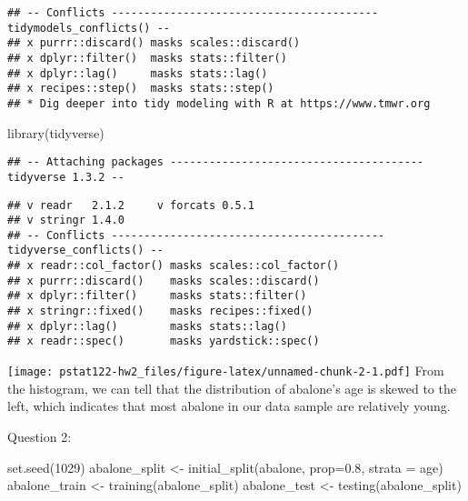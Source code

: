 \documentclass[
]{article}
\newenvironment{Shaded}{\begin{snugshade}}{\end{snugshade}}
\newcommand{\AttributeTok}[1]{\textcolor[rgb]{0.77,0.63,0.00}{#1}}
\newcommand{\DecValTok}[1]{\textcolor[rgb]{0.00,0.00,0.81}{#1}}
\newcommand{\FloatTok}[1]{\textcolor[rgb]{0.00,0.00,0.81}{#1}}
\newcommand{\FunctionTok}[1]{\textcolor[rgb]{0.00,0.00,0.00}{#1}}
\newcommand{\NormalTok}[1]{#1}
\newcommand{\OtherTok}[1]{\textcolor[rgb]{0.56,0.35,0.01}{#1}}
\newcommand{\SpecialCharTok}[1]{\textcolor[rgb]{0.00,0.00,0.00}{#1}}
\begin{document}
\begin{verbatim}
## -- Conflicts ----------------------------------------- tidymodels_conflicts() --
## x purrr::discard() masks scales::discard()
## x dplyr::filter()  masks stats::filter()
## x dplyr::lag()     masks stats::lag()
## x recipes::step()  masks stats::step()
## * Dig deeper into tidy modeling with R at https://www.tmwr.org
\end{verbatim}

\begin{Shaded}
\begin{Highlighting}[]
\FunctionTok{library}\NormalTok{(tidyverse)}
\end{Highlighting}
\end{Shaded}

\begin{verbatim}
## -- Attaching packages --------------------------------------- tidyverse 1.3.2 --
\end{verbatim}

\begin{verbatim}
## v readr   2.1.2     v forcats 0.5.1
## v stringr 1.4.0     
## -- Conflicts ------------------------------------------ tidyverse_conflicts() --
## x readr::col_factor() masks scales::col_factor()
## x purrr::discard()    masks scales::discard()
## x dplyr::filter()     masks stats::filter()
## x stringr::fixed()    masks recipes::fixed()
## x dplyr::lag()        masks stats::lag()
## x readr::spec()       masks yardstick::spec()
\end{verbatim}

\begin{Shaded}
\end{Shaded}

\texttt{[image: pstat122-hw2\_files/figure-latex/unnamed-chunk-2-1.pdf]}
\n From the histogram, we can tell that the distribution of abalone's
age is skewed to the left, which indicates that most abalone in our data
sample are relatively young. \n

Question 2:

\begin{Shaded}
\begin{Highlighting}[]
\FunctionTok{set.seed}\NormalTok{(}\DecValTok{1029}\NormalTok{)}
\NormalTok{abalone\_split }\OtherTok{\textless{}{-}} \FunctionTok{initial\_split}\NormalTok{(abalone, }\AttributeTok{prop=}\FloatTok{0.8}\NormalTok{, }\AttributeTok{strata =}\NormalTok{ age)}
\NormalTok{abalone\_train }\OtherTok{\textless{}{-}} \FunctionTok{training}\NormalTok{(abalone\_split)}
\NormalTok{abalone\_test }\OtherTok{\textless{}{-}} \FunctionTok{testing}\NormalTok{(abalone\_split)}
\end{Highlighting}
\end{Shaded}
\end{document}
